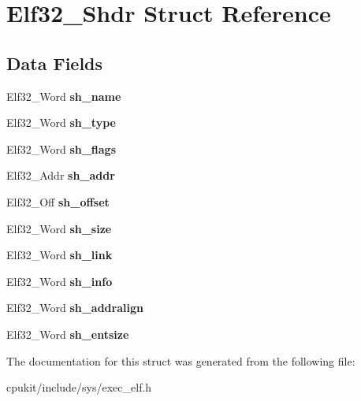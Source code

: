 \hypertarget{structElf32__Shdr}{}\section{Elf32\+\_\+\+Shdr Struct Reference}
\label{structElf32__Shdr}
\subsection*{Data Fields}
\begin{DoxyCompactItemize}
\item 
\mbox{\label{structElf32__Shdr_a6e8fd300ca473a31d0f65817ce371dfd}} 
Elf32\+\_\+\+Word {\bfseries sh\+\_\+name}
\item 
\mbox{\label{structElf32__Shdr_aab6c221dbd7e16987df41280fb915408}} 
Elf32\+\_\+\+Word {\bfseries sh\+\_\+type}
\item 
\mbox{\label{structElf32__Shdr_a27e003d8da37de3038a0065577a7743d}} 
Elf32\+\_\+\+Word {\bfseries sh\+\_\+flags}
\item 
\mbox{\label{structElf32__Shdr_a7e668a62cee74a2f9c6edabb5f45635a}} 
Elf32\+\_\+\+Addr {\bfseries sh\+\_\+addr}
\item 
\mbox{\label{structElf32__Shdr_a6e37227a5777cddc0a9dbbb3c2598ec1}} 
Elf32\+\_\+\+Off {\bfseries sh\+\_\+offset}
\item 
\mbox{\label{structElf32__Shdr_a84dc67bb0ab65880bbcd74fbee722ff1}} 
Elf32\+\_\+\+Word {\bfseries sh\+\_\+size}
\item 
\mbox{\label{structElf32__Shdr_ad759308388eb14c5c6e4d636c38999da}} 
Elf32\+\_\+\+Word {\bfseries sh\+\_\+link}
\item 
\mbox{\label{structElf32__Shdr_aef63fe62c2c9927f374c4f987954c6e5}} 
Elf32\+\_\+\+Word {\bfseries sh\+\_\+info}
\item 
\mbox{\label{structElf32__Shdr_a399f50b3591e6286d4ad819f790979ed}} 
Elf32\+\_\+\+Word {\bfseries sh\+\_\+addralign}
\item 
\mbox{\label{structElf32__Shdr_a10c59cecc928aae27930601fe545d3ca}} 
Elf32\+\_\+\+Word {\bfseries sh\+\_\+entsize}
\end{DoxyCompactItemize}


The documentation for this struct was generated from the following file\+:\begin{DoxyCompactItemize}
\item 
cpukit/include/sys/exec\+\_\+elf.\+h\end{DoxyCompactItemize}

